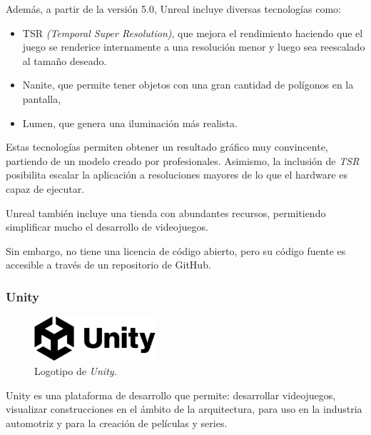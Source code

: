 \bigskip

Además, a partir de la versión 5.0, Unreal incluye diversas tecnologías como: 

\begin{itemize}
   \item TSR \textit{(Temporal Super Resolution)}, que mejora el rendimiento haciendo que el juego se renderice internamente a una resolución menor y luego sea reescalado al tamaño deseado.
   \item Nanite, que permite tener objetos con una gran cantidad de polígonos en la pantalla, 
   \item Lumen, que genera una iluminación más realista.
\end{itemize}

Estas tecnologías permiten obtener un resultado gráfico muy convincente, partiendo de un modelo creado por profesionales. Asimismo, la inclusión de \textit{TSR} posibilita escalar la aplicación a resoluciones mayores de lo que el hardware es capaz de ejecutar.

\bigskip

Unreal también incluye una tienda con abundantes recursos, permitiendo simplificar mucho el desarrollo de videojuegos.

\bigskip

Sin embargo, no tiene una licencia de código abierto, pero su código fuente es accesible a través de un repositorio de GitHub.

\subsubsection{Unity}

\begin{figure}[H]
   \centering
   \includegraphics[width=0.4\textwidth]{imagenes/UNITY_LOGO.png}
   \caption{Logotipo de \textit{Unity}\cite{unity}.}
\end{figure}

Unity \cite{unity} es una plataforma de desarrollo que permite: desarrollar videojuegos, visualizar construcciones en el ámbito de la arquitectura, para uso en la industria automotriz y para la creación de películas y series.

